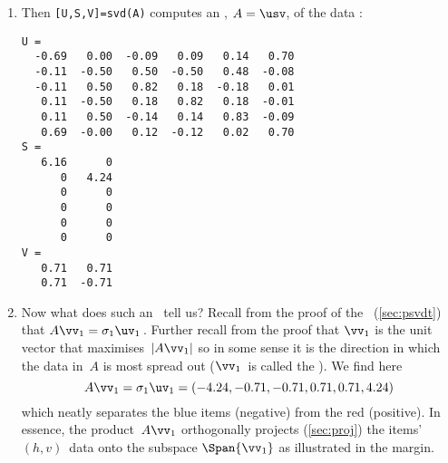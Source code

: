 \begin{example}
\begin{solution}
\begin{enumerate}
\item Then \verb|[U,S,V]=svd(A)| computes an \svd, \(A=\usv\), of the data \twodp:
\begin{verbatim}
U =
  -0.69   0.00  -0.09   0.09   0.14   0.70
  -0.11  -0.50   0.50  -0.50   0.48  -0.08
  -0.11   0.50   0.82   0.18  -0.18   0.01
   0.11  -0.50   0.18   0.82   0.18  -0.01
   0.11   0.50  -0.14   0.14   0.83  -0.09
   0.69  -0.00   0.12  -0.12   0.02   0.70
S =
   6.16      0
      0   4.24
      0      0
      0      0
      0      0
      0      0
V =
   0.71   0.71
   0.71  -0.71
\end{verbatim}

\item Now what does such an \svd\ tell us?
Recall from the proof of the \svd\ (\autoref{sec:psvdt}) that \(A\vv_1=\sigma_1\uv_1\)\,. 
Further recall from the proof that \(\vv_1\) is the unit vector that maximises~\(|A\vv_1|\) so in some sense it is the direction in which the data in~\(A\) is most spread out (\(\vv_1\)~is called the ).
We find here \twodp
{}%
\begin{equation*}
A\vv_1=\sigma_1\uv_1=(-4.24,-0.71,-0.71,0.71,0.71,4.24)
\end{equation*}
which neatly separates the blue items (negative) from the red (positive).
In essence, the product~\(A\vv_1\) orthogonally projects (\autoref{sec:proj}) the items' \((h,v)\)~data onto the subspace \(\Span\{\vv_1\}\) as illustrated in the margin. 
\end{enumerate}
\end{solution}
\end{example}

